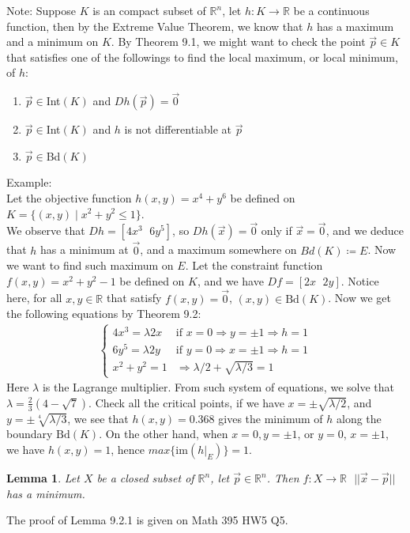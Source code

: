 \documentclass[15pt]{book}
\theoremstyle{break}
\theoremstyle{break}
\newtheorem{lem}{Lemma}[thm]
\newcommand{\R}{\mathbb{R}}
\newcommand{\Bd}{\text{Bd}}
\newcommand{\note}{\color{red}Note: \color{black}}
\newcommand{\example}{\color{green}Example: \color{black}}
\begin{document}
\note Suppose $K$ is an compact subset of $\R^n$, let $h: K \to \R$ be a continuous function, then by the Extreme Value Theorem, we know that $h$ has a maximum and a minimum on $K$. By Theorem 9.1, we might want to check the point $\vec{p}\in K$ that satisfies one of the followings to find the local maximum, or local minimum, of $h$:
\begin{enumerate}[topsep=3pt,itemsep=-1ex,partopsep=1ex,parsep=1ex]
\item $\vec{p} \in $Int$(K)$ and $Dh(\vec{p}) = \vec{0}$
\item $\vec{p} \in $Int$(K)$ and $h$ is not differentiable at $\vec{p}$
\item $\vec{p} \in $Bd$(K)$\\
\end{enumerate}

\hfill\break
\example \\
Let the objective function $h(x,y) = x^4+y^6$ be defined on $K=\{(x,y) \mid x^2+y^2 \leq 1\}$. \\We observe that $Dh= [4x^3 \ \ \, 6y^5]$, so $Dh(\vec{x}) = \vec{0}$ only if $\vec{x} = \vec{0}$, and we deduce that $h$ has a minimum at $\vec{0}$, and a maximum somewhere on $Bd(K) \coloneqq E$. Now we want to find such maximum on $E$. Let the constraint function $f(x,y) = x^2+y^2-1$ be defined on $K$, and we have $Df=[2x \ \ \, 2y]$. Notice here, for all $x,y \in \R$ that satisfy $f(x,y) = \vec{0}$, $(x,y) \in \Bd(K)$. Now we get the following equations by Theorem 9.2:
\begin{align*}
\begin{cases}
4x^3 = \lambda 2x & \text{if\ }x=0\Rightarrow y=\pm1 \Rightarrow h=1\\ 
6y^5 = \lambda 2y & \text{if\ }y=0\Rightarrow x=\pm1 \Rightarrow h=1\\ 
x^2+y^2 = 1 & \Rightarrow \lambda/2 + \sqrt{\lambda/3} = 1
\end{cases}
\end{align*}
Here $\lambda$ is the Lagrange multiplier. From such system of equations, we solve that $\lambda = \frac{2}{3}(4-\sqrt{7})$. Check all the critical points, if we have $x = \pm \sqrt{\lambda / 2}$, and $y = \pm\sqrt[4]{\lambda/3}$, we see that $h(x,y) = 0.368$ gives the minimum of $h$ along the boundary $\Bd(K)$. On the other hand, when $x=0, y=\pm1$, or $y=0$, $x=\pm1$, we have $h(x,y) = 1$, hence $max\{$im$(h|_E)\} = 1$. 
\hfill\break

\begin{lem}
Let $X$ be a closed subset of $\R^n$, let $\vec{p}\in \R^n$. Then $f:X \to \R \ \ \ ||\vec{x}-\vec{p}||$ has a minimum. 
\end{lem}
The proof of Lemma 9.2.1 is given on Math 395 HW5 Q5.\\
\end{document}
